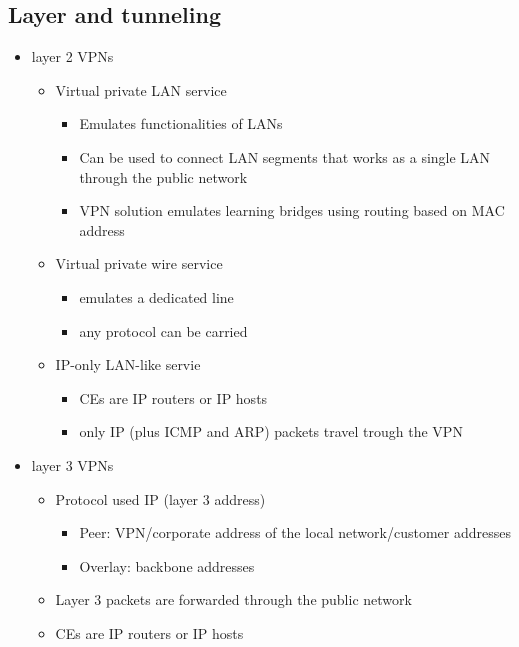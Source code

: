 \documentclass{article}
\begin{document}
\subsection{Layer and tunneling}
\begin{itemize}
    \item layer 2 VPNs
    \begin{itemize}
        \item Virtual private LAN service
        \begin{itemize}
            \item Emulates functionalities of LANs
            \item Can be used to connect LAN segments that works as a single LAN through the public network
            \item VPN solution emulates learning bridges using routing based on MAC address
        \end{itemize}
        \item Virtual private wire service
        \begin{itemize}
            \item emulates a dedicated line
            \item any protocol can be carried
        \end{itemize}
        \item IP-only LAN-like servie
        \begin{itemize}
            \item CEs are IP routers or IP hosts 
            \item only IP (plus ICMP and ARP) packets travel trough the VPN
        \end{itemize}
    \end{itemize}
    \item layer 3 VPNs
    \begin{itemize}
        \item Protocol used IP (layer 3 address)
        \begin{itemize}
            \item Peer: VPN/corporate address of the local network/customer addresses
            \item Overlay: backbone addresses
        \end{itemize}
        \item Layer 3 packets are forwarded through the public network
        \item CEs are IP routers or IP hosts
    \end{itemize}

\end{itemize}
\end{document}
